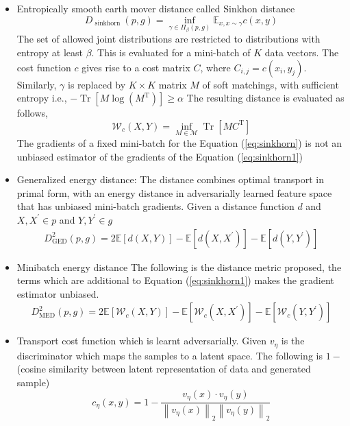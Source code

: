\begin{itemize}
    \item Entropically smooth earth mover distance called Sinkhon distance
    \begin{equation}
        \label{eq:sinkhorn1}
        D_{\text { sinkhorn }}(p, g)=\inf _{\gamma \in \Pi_{\beta}(p, g)} \mathbb{E}_{x, x \sim \gamma} c(x, y)
    \end{equation}
    The set of allowed joint distributions are restricted to distributions with entropy at least $\beta$. This is evaluated for a mini-batch of $K$ data vectors.  The cost function $c$ gives rise to a cost matrix $C$, where $C_{i,j} = c(x_i, y_j)$. Similarly, $\gamma$ is replaced by $K \times K$ matrix $M$ of soft matchings, with sufficient entropy i.e., $-\operatorname{Tr}\left[M \log \left(M^{\mathrm{T}}\right)\right] \geq \alpha$ The resulting distance is evaluated as follows,
    \begin{equation}
    \label{eq:sinkhorn}
        \mathcal{W}_{c}(X, Y)=\inf _{M \in \mathcal{M}} \operatorname{Tr}\left[M C^{\mathrm{T}}\right]
    \end{equation}{}
The gradients of a fixed mini-batch for the Equation (\ref{eq:sinkhorn}) is not an unbiased estimator of the gradients of the Equation (\ref{eq:sinkhorn1})

    \item Generalized energy distance: The distance combines optimal transport in primal form, with an energy distance in adversarially learned feature space that has unbiased mini-batch gradients. Given a distance function $d$ and $X,X^{\prime} \in p$ and $Y, Y^{\prime} \in g$
    \begin{equation}
        \begin{aligned}
        D_{\mathrm{GED}}^2(p, g)=2 \mathbb{E}[d(X, Y)]- \mathbb{E}\left[d\left(X, X^{\prime}\right)\right] 
        -\mathbb{E}\left[d\left(Y, Y^{\prime}\right)\right]
        \end{aligned}
    \end{equation}
    \item Minibatch energy distance 
    The following is the distance metric proposed, the terms which are additional to Equation (\ref{eq:sinkhorn1}) makes the gradient estimator unbiased.
    \begin{equation}
        \begin{aligned}
        D_{\mathrm{MED}}^{2}(p, g)=2 \mathbb{E}\left[\mathcal{W}_{c}(X, Y)\right]-\mathbb{E}\left[\mathcal{W}_{c}\left(X, X^{\prime}\right)\right] 
        -\mathbb{E}\left[\mathcal{W}_{c}\left(Y, Y^{\prime}\right)\right]
        \end{aligned}
    \end{equation}

    \item Transport cost function which is learnt adversarially. Given $v_{\eta}$ is the discriminator which maps the samples to a latent space. The following is $1 -$ (cosine similarity between latent representation of data and generated sample)
    $$
c_{\eta}(x, y)=1-\frac{v_{\eta}(x) \cdot v_{\eta}(y)}{\left\|v_{\eta}(x)\right\|_{2}\left\|v_{\eta}(y)\right\|_{2}}
$$
\end{itemize}{}
